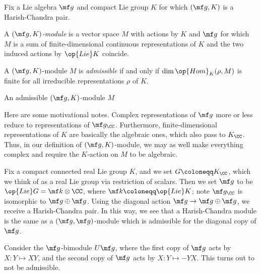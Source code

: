 \documentclass[../notes.tex]{subfiles}
\begin{document}
\begin{defihelper}[$(\mf g,K)$-module] 
	Fix a Lie algebra $\mf g$ and compact Lie group $K$ for which $(\mf g,K)$ is a Harish-Chandra pair.
	\begin{listalph}
		\item A \textit{$(\mf g,K)$-module} is a vector space $M$ with actions by $K$ and $\mf g$ for which $M$ is a sum of finite-dimensional continuous representations of $K$ and the two induced actions by $\op{Lie}K$ coincide.
		\item A $(\mf g,K)$-module $M$ is \textit{admissible} if and only if $\dim\op{Hom}_K(\rho,M)$ is finite for all irreducible representations $\rho$ of $K$.
		\item An admissible $(\mf g,K)$-module $M$
	\end{listalph}
\end{defihelper}
\begin{remark}
	Here are some motivational notes. Complex representations of $\mf g$ more or less reduce to representations of $\mf g_\CC$. Furthermore, finite-dimensional representations of $K$ are basically the algebraic ones, which also pass to $K_\CC$. Thus, in our definition of $(\mf g,K)$-module, we may as well make everything complex and require the $K$-action on $M$ to be algebraic.
\end{remark}
\begin{example}
	Fix a compact connected real Lie group $K$, and we set $G\coloneqq K_\CC$, which we think of as a real Lie group via restriction of scalars. Then we set $\mf g$ to be $\op{Lie}G=\mf k\otimes\CC$, where $\mf k\coloneqq\op{Lie}K$; note $\mf g_\CC$ is isomorphic to $\mf g\oplus\mf g$. Using the diagonal action $\mf g\to\mf g\oplus\mf g$, we receive a Harish-Chandra pair. In this way, we see that a Harish-Chandra module is the same as a $(\mf g,\mf g)$-module which is admissible for the diagonal copy of $\mf g$.
\end{example}
\begin{example}
	Consider the $\mf g$-bimodule $U\mf g$, where the first copy of $\mf g$ acts by $X\colon Y\mapsto XY$, and the second copy of $\mf g$ acts by $X\colon Y\mapsto-YX$. This turns out to not be admissible.
\end{example}
\end{document}
